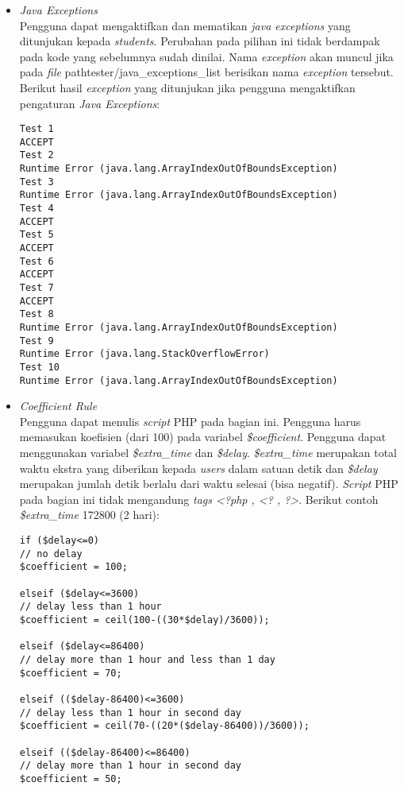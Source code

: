\begin{itemize}
	\item \textit{Java Exceptions}\\
	Pengguna dapat mengaktifkan dan mematikan \textit{java exceptions} yang ditunjukan kepada \textit{students}. Perubahan pada pilihan ini tidak berdampak pada kode yang sebelumnya sudah dinilai. Nama \textit{exception} akan muncul jika pada \textit{file} path{tester/java\_exceptions\_list} berisikan nama \textit{exception} tersebut. Berikut hasil \textit{exception} yang ditunjukan jika pengguna mengaktifkan pengaturan \textit{Java Exceptions}: 
	\begin{lstlisting}[basicstyle=\ttfamily, frame=single,
columns=fullflexible, keepspaces=true, breaklines=true]
Test 1
ACCEPT
Test 2
Runtime Error (java.lang.ArrayIndexOutOfBoundsException)
Test 3
Runtime Error (java.lang.ArrayIndexOutOfBoundsException)
Test 4
ACCEPT
Test 5
ACCEPT
Test 6
ACCEPT
Test 7
ACCEPT
Test 8
Runtime Error (java.lang.ArrayIndexOutOfBoundsException)
Test 9
Runtime Error (java.lang.StackOverflowError)
Test 10
Runtime Error (java.lang.ArrayIndexOutOfBoundsException)
\end{lstlisting}
	
	\item \textit{\textit{Coefficient Rule}} \\
	Pengguna dapat menulis \textit{script} PHP pada bagian ini. Pengguna harus memasukan koefisien (dari 100) pada variabel \textit{\$coefficient}. Pengguna dapat menggunakan variabel \textit{\$extra\_time} dan \textit{\$delay}. \textit{\$extra\_time} merupakan total waktu ekstra yang diberikan kepada \textit{users} dalam satuan detik dan \textit{\$delay} merupakan jumlah detik berlalu dari waktu selesai (bisa negatif). \textit{Script} PHP pada bagian ini tidak mengandung \textit{tags <?php , <? , ?>}. Berikut contoh \textit{\$extra\_time} 172800 (2 hari):
	\begin{lstlisting}[basicstyle=\ttfamily, frame=single,
columns=fullflexible, keepspaces=true, breaklines=true]
if ($delay<=0)
// no delay
$coefficient = 100;

elseif ($delay<=3600)
// delay less than 1 hour
$coefficient = ceil(100-((30*$delay)/3600));

elseif ($delay<=86400)
// delay more than 1 hour and less than 1 day
$coefficient = 70;

elseif (($delay-86400)<=3600)
// delay less than 1 hour in second day
$coefficient = ceil(70-((20*($delay-86400))/3600));

elseif (($delay-86400)<=86400)
// delay more than 1 hour in second day
$coefficient = 50;


\end{lstlisting}
\end{itemize}
